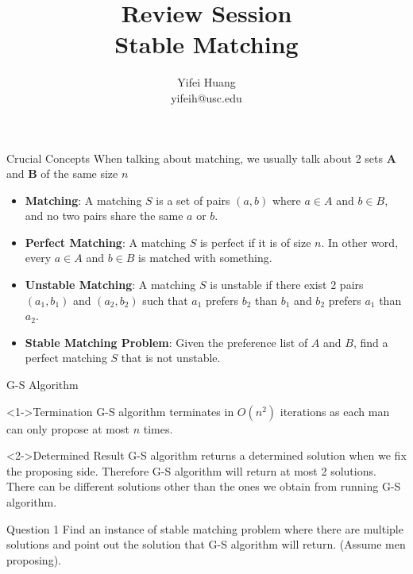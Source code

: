 \documentclass{beamer}
\title{Review Session\\ Stable Matching}
\author{Yifei Huang \\ yifeih@usc.edu}
\begin{document}
\begin{frame}
	\maketitle
\end{frame}
\begin{frame}{Crucial Concepts}
	When talking about matching, we usually talk about 2 sets \textbf{A} and \textbf{B} of the same size $n$
	\begin{itemize}
		\item<1-> \textbf{Matching}: A matching $S$ is a set of pairs $(a,b)$ where $a \in A$ and $b \in B$, and no two
			pairs share the same $a$ or $b$.
		\item<2-> \textbf{Perfect Matching}: A matching $S$ is perfect if it is of size $n$. In other word, every $a \in A$
			and $b \in B$ is matched with something.
		\item<3-> \textbf{Unstable Matching}: A matching $S$ is unstable if there exist 2 pairs $(a_1,b_1)$ and $(a_2,b_2)$
			such that $a_1$ prefers $b_2$ than $b_1$ and $b_2$ prefers $a_1$ than $a_2$.
		\item<4-> \textbf{Stable Matching Problem}: Given the preference list of $A$ and $B$, find a perfect matching $S$
			that is not unstable.
	\end{itemize}
\end{frame}

\begin{frame}{G-S Algorithm}
	\begin{block}<1->{Termination}
		G-S algorithm terminates in $O(n^2)$ iterations as each man can only propose at most $n$ times.
	\end{block}
	\begin{alertblock}<2->{Determined Result}
		G-S algorithm returns a determined solution when we fix the proposing side. Therefore G-S algorithm will return
		at most 2 solutions. There can be different solutions other than the ones we obtain from running G-S algorithm.
	\end{alertblock}
\end{frame}

\begin{frame}{Question 1}
	Find an instance of stable matching problem where there are multiple solutions and point out the solution that G-S
	algorithm will return. (Assume men proposing).
\end{frame}
\end{document}
